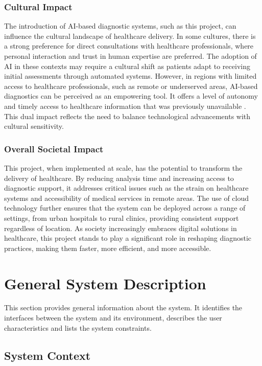 \documentclass[12pt]{article}
\begin{document}
\subsubsection{Cultural Impact}
The introduction of AI-based diagnostic systems, such as this project, can influence the cultural landscape of healthcare delivery. In some cultures, there is a strong preference for direct consultations with healthcare professionals, where personal interaction and trust in human expertise are preferred. The adoption of AI in these contexts may require a cultural shift as patients adapt to receiving initial assessments through automated systems. However, in regions with limited access to healthcare professionals, such as remote or underserved areas, AI-based diagnostics can be perceived as an empowering tool. It offers a level of autonomy and timely access to healthcare information that was previously unavailable \cite{6}. This dual impact reflects the need to balance technological advancements with cultural sensitivity.

\subsubsection{Overall Societal Impact}
This project, when implemented at scale, has the potential to transform the delivery of healthcare. By reducing analysis time and increasing access to diagnostic support, it addresses critical issues such as the strain on healthcare systems and accessibility of medical services in remote areas. The use of cloud technology further ensures that the system can be deployed across a range of settings, from urban hospitals to rural clinics, providing consistent support regardless of location. As society increasingly embraces digital solutions in healthcare, this project stands to play a significant role in reshaping diagnostic practices, making them faster, more efficient, and more accessible.

\section{General System Description}

This section provides general information about the system.  It identifies the
interfaces between the system and its environment, describes the user
characteristics and lists the system constraints. \\

\subsection{System Context}
 
\end{document}

